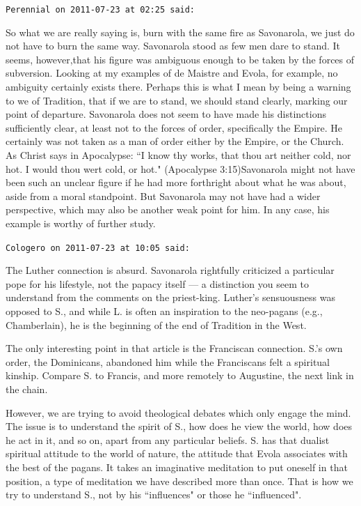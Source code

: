 \begin{footnotesize}
\begin{sffamily}
\hfill

\texttt{Perennial on 2011-07-23 at 02:25 said: }

So what we are really saying is, burn with the same fire as Savonarola, we just do not have to burn the same way. Savonarola stood as few men dare to stand. It seems, however,that his figure was ambiguous enough to be taken by the forces of subversion. Looking at my examples of de Maistre and Evola, for example, no ambiguity certainly exists there. Perhaps this is what I mean by being a warning to we of Tradition, that if we are to stand, we should stand clearly, marking our point of departure. Savonarola does not seem to have made his distinctions sufficiently clear, at least not to the forces of order, specifically the Empire. He certainly was not taken as a man of order either by the Empire, or the Church. As Christ says in Apocalypse: ``I know thy works, that thou art neither cold, nor hot. I would thou wert cold, or hot." (Apocalypse 3:15)Savonarola might not have been such an unclear figure if he had more forthright about what he was about, aside from a moral standpoint. But Savonarola may not have had a wider perspective, which may also be another weak point for him. In any case, his example is worthy of further study.


\hfill

\texttt{Cologero on 2011-07-23 at 10:05 said: }

The Luther connection is absurd. Savonarola rightfully criticized a particular pope for his lifestyle, not the papacy itself — a distinction you seem to understand from the comments on the priest-king. Luther's sensuousness was opposed to S., and while L. is often an inspiration to the neo-pagans (e.g., Chamberlain), he is the beginning of the end of Tradition in the West.

The only interesting point in that article is the Franciscan connection. S.'s own order, the Dominicans, abandoned him while the Franciscans felt a spiritual kinship. Compare S. to Francis, and more remotely to Augustine, the next link in the chain.

However, we are trying to avoid theological debates which only engage the mind. The issue is to understand the spirit of S., how does he view the world, how does he act in it, and so on, apart from any particular beliefs. S. has that dualist spiritual attitude to the world of nature, the attitude that Evola associates with the best of the pagans. It takes an imaginative meditation to put oneself in that position, a type of meditation we have described more than once. That is how we try to understand S., not by his ``influences" or those he ``influenced".


\end{sffamily}
\end{footnotesize}
